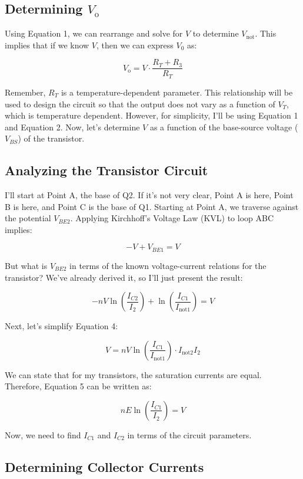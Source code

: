 \documentclass[a4paper,9pt,twoside,openany,twocolumn]{memoir}
\begin{document}
\subsection*{Determining \( V_{\text{o}} \)}

Using Equation 1, we can rearrange and solve for \( V \) to determine \( V_{\text{not}} \). This implies that if we know \( V \), then we can express \( V_{\text{0}} \) as:

\[
V_{\text{o}} = V \cdot \frac{R_T + R_3}{R_T}
\]

Remember, \( R_T \) is a temperature-dependent parameter. This relationship will be used to design the circuit so that the output does not vary as a function of \( V_T \), which is temperature dependent. However, for simplicity, I'll be using Equation 1 and Equation 2. Now, let's determine \( V \) as a function of the base-source voltage (\( V_{BS} \)) of the transistor.

\subsection*{Analyzing the Transistor Circuit}

I'll start at Point A, the base of Q2. If it's not very clear, Point A is here, Point B is here, and Point C is the base of Q1. Starting at Point A, we traverse against the potential \( V_{BE2} \). Applying Kirchhoff's Voltage Law (KVL) to loop ABC implies:

\[
-V + V_{BE1} = V
\]

But what is \( V_{BE2} \) in terms of the known voltage-current relations for the transistor? We've already derived it, so I'll just present the result:

\[
-n V \ln\left(\frac{I_{C2}}{I_2}\right) + \ln\left(\frac{I_{C1}}{I_{\text{not1}}}\right) = V
\]

Next, let's simplify Equation 4:

\[
V = n V \ln\left(\frac{I_{C1}}{I_{\text{not1}}}\right) \cdot I_{\text{not2}} I_2
\]

We can state that for my transistors, the saturation currents are equal. Therefore, Equation 5 can be written as:

\[
n E \ln\left(\frac{I_{C1}}{I_2}\right) = V
\]

Now, we need to find \( I_{C1} \) and \( I_{C2} \) in terms of the circuit parameters.

\subsection*{Determining Collector Currents}
\end{document}
